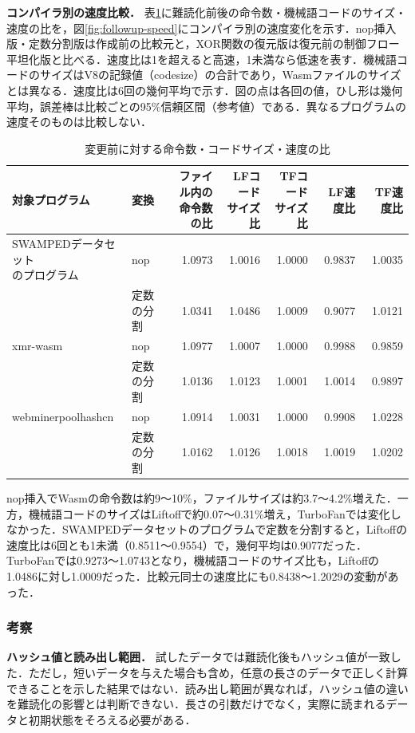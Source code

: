 \documentclass[submit,techrep]{ipsj}
\begin{document}
\label{sec:followup-performance}
\noindent\textbf{コンパイラ別の速度比較．}
表\ref{tab:followup-performance}に難読化前後の命令数・機械語コードのサイズ・速度の比を，図\ref{fig:followup-speed}にコンパイラ別の速度変化を示す．nop挿入版・定数分割版は作成前の比較元と，XOR関数の復元版は復元前の制御フロー平坦化版と比べる．速度比は1を超えると高速，1未満なら低速を表す．機械語コードのサイズはV8の記録値（codesize）の合計であり，Wasmファイルのサイズとは異なる．速度比は6回の幾何平均で示す．図の点は各回の値，ひし形は幾何平均，誤差棒は比較ごとの95\%信頼区間（参考値）である．異なるプログラムの速度そのものは比較しない．
\begin{table}[t]
\centering\small
\caption{変更前に対する命令数・コードサイズ・速度の比}
\label{tab:followup-performance}
\setlength{\tabcolsep}{5pt}
\begin{tabular}{llrrrrr}
\hline
対象プログラム & 変換 & \shortstack{ファイル内の\\命令数の比} & \shortstack{LFコード\\サイズ比} & \shortstack{TFコード\\サイズ比} & LF速度比 & TF速度比 \\
\hline
\shortstack[l]{SWAMPEDデータセット\\のプログラム} & nop & 1.0973 & 1.0016 & 1.0000 & 0.9837 & 1.0035 \\
 & 定数の分割 & 1.0341 & 1.0486 & 1.0009 & 0.9077 & 1.0121 \\
xmr-wasm & nop & 1.0977 & 1.0007 & 1.0000 & 0.9988 & 0.9859 \\
 & 定数の分割 & 1.0136 & 1.0123 & 1.0001 & 1.0014 & 0.9897 \\
webminerpoolhashcn & nop & 1.0914 & 1.0031 & 1.0000 & 0.9908 & 1.0228 \\
 & 定数の分割 & 1.0162 & 1.0126 & 1.0018 & 1.0019 & 1.0202 \\
\hline
\end{tabular}
\end{table}
nop挿入でWasmの命令数は約9～10\%，ファイルサイズは約3.7～4.2\%増えた．一方，機械語コードのサイズはLiftoffで約0.07～0.31\%増え，TurboFanでは変化しなかった．SWAMPEDデータセットのプログラムで定数を分割すると，Liftoffの速度比は6回とも1未満（0.8511～0.9554）で，幾何平均は0.9077だった．TurboFanでは0.9273～1.0743となり，機械語コードのサイズ比も，Liftoffの1.0486に対し1.0009だった．比較元同士の速度比にも0.8438～1.2029の変動があった．

\subsubsection{考察}
\noindent\textbf{ハッシュ値と読み出し範囲．}
試したデータでは難読化後もハッシュ値が一致した．ただし，短いデータを与えた場合も含め，任意の長さのデータで正しく計算できることを示した結果ではない．読み出し範囲が異なれば，ハッシュ値の違いを難読化の影響とは判断できない．長さの引数だけでなく，実際に読まれるデータと初期状態をそろえる必要がある．
\end{document}
